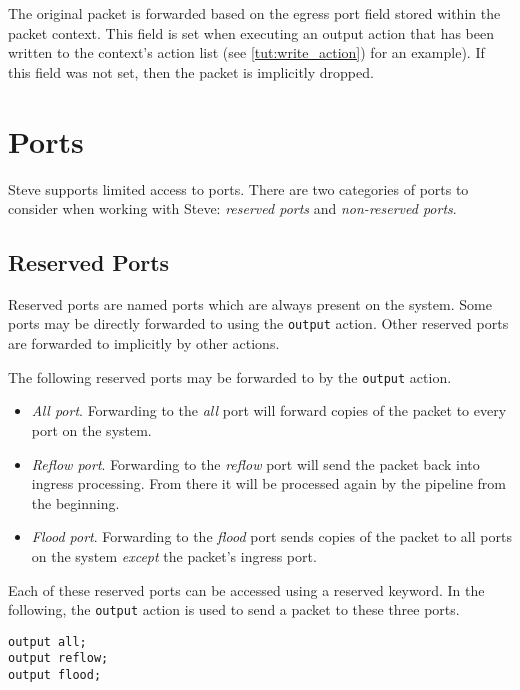 The original packet is forwarded based on the egress port field stored
within the packet context. This field is set when executing an
output action that has been written to the context's action list
(see \ref{tut:write_action}) for an example). If this field was not set,
then the packet is implicitly dropped.

\section{Ports} \label{tut:ports}

Steve supports limited access to ports.
There are two categories of ports to consider when working with Steve: 
\textit{reserved ports} and
\textit{non-reserved ports}.

\subsection {Reserved Ports} \label{tut:reserved_ports}

Reserved ports are named ports which are always present on the system. Some ports may
be directly forwarded to using the \texttt{output} action. Other reserved ports 
are forwarded to implicitly by other actions.

The following reserved ports may be forwarded to by the \texttt{output} action.

\begin{itemize}
\item \emph{All port}. Forwarding to the \textit{all} port will forward copies of the packet to
every port on the system.

\item \emph{Reflow port}. Forwarding to the \textit{reflow} port will send the packet back into
ingress processing. From there it will be processed again by the pipeline from
the beginning.

\item \emph{Flood port}. Forwarding to the \textit{flood} port sends copies of the packet to all
ports on the system \textit{except} the packet's ingress port.
\end{itemize}

Each of these reserved ports can be accessed using a reserved keyword. In the
following, the \texttt{output} action is used to send a packet to these three
ports.

\begin{codepage}
\begin{lstlisting}
output all;
output reflow;
output flood;
\end{lstlisting}
\end{codepage}

